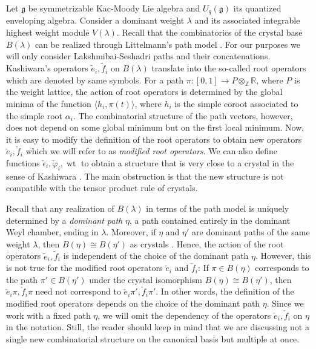 \documentclass[final]{amsart}
\theoremstyle{plain}
\theoremstyle{definition}
\newcommand{\bbR}{\mathbb R}
\newcommand{\bbZ}{\mathbb Z}
\newcommand{\frakg}{\mathfrak g}
\newcommand{\te}{\tilde e}
\newcommand{\tf}{\tilde f}
\newcommand{\cf}{\check{f}}
\newcommand{\ce}{\check{e}}
\newcommand{\cepsilon}{\check{\epsilon}}
\newcommand{\cphi}{\check{\varphi}}
\DeclareMathOperator{\weight}{wt}
\begin{document}
Let $\frakg$ be symmetrizable Kac-Moody Lie algebra and $U_q(\frakg)$ its quantized enveloping algebra.
Consider a dominant weight $\lambda$ and its associated integrable highest weight module $V(\lambda)$.
Recall that the combinatorics of the crystal base $B(\lambda)$ can be realized through Littelmann's path model \cite{Kashiwara:Similarity-CrystalBases}.
For our purposes we will only consider Lakshmibai-Seshadri paths and their concatenations.
Kashiwara's operators $\te_i, \tf_i$ on $B(\lambda)$ translate into the so-called root operators which are denoted by same symbols.
For a path $\pi\colon [0,1] \to P \otimes_\bbZ \bbR$, where $P$ is the weight lattice, the action of root operators is determined by the global minima of the function $\langle h_i, \pi(t)\rangle$, where $h_i$ is the simple coroot associated to the simple root $\alpha_i$.
The combinatorial structure of the path vectors, however, does not depend on some global minimum but on the first local minimum.
Now, it is easy to modify the definition of the root operators to obtain new operators $\ce_i, \cf_i$ which we will refer to as \emph{modified root operators}.
We can also define functions $\cepsilon_i, \cphi_i, \weight$ to obtain a structure that is very close to a crystal in the sense of Kashiwara \cite{Kashiwara:CrystalBase-Littelmann-DemazureCharacterFormula}.
The main obstruction is that the new structure is not compatible with the tensor product rule of crystals.

Recall that any realization of $B(\lambda)$ in terms of the path model is uniquely determined by a \emph{dominant path} $\eta$, a path contained entirely in the dominant Weyl chamber, ending in $\lambda$.
Moreover, if $\eta$ and $\eta'$ are dominant paths of the same weight $\lambda$, then $B(\eta) \cong B(\eta')$ as crystals \cite{Littelmann:Paths-RootOperators-RepresentationTheory}.
Hence, the action of the root operators $\te_i, \tf_i$ is independent of the choice of the dominant path $\eta$.
However, this is not true for the modified root operators $\ce_i$ and $\cf_i$:
If $\pi \in B(\eta)$ corresponds to the path $\pi' \in B(\eta')$ under the crystal isomorphism $B(\eta) \cong B(\eta')$, then $\ce_i\pi, \cf_i\pi$ need not correspond to $\ce_i\pi',\cf_i\pi'$.
In other words, the definition of the modified root operators depends on the choice of the dominant path $\eta$.
Since we work with a fixed path $\eta$, we will omit the dependency of the operators $\ce_i,\cf_i$ on $\eta$ in the notation.
Still, the reader should keep in mind that we are discussing not a single new combinatorial structure on the canonical basis but multiple at once.
\end{document}
